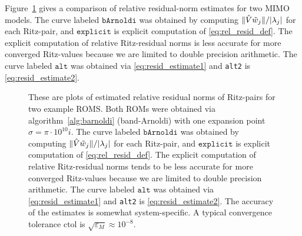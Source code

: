 Figure~\ref{fig:barnoldi_rel_resid_norms1} gives a comparison of relative residual-norm estimates for two MIMO models.   The curve labeled $\texttt{bArnoldi}$ was obtained by computing $\| \hat{V} \tilde{w}_j \| / | \lambda_j|$ for each Ritz-pair, and $\texttt{explicit}$ is explicit computation of \eqref{eq:rel_resid_def}.     The explicit computation of relative Ritz-residual norms is less accurate for more converged Ritz-values because we are limited to double precision arithmetic.  The curve labeled $\texttt{alt}$ was obtained via \eqref{eq:resid_estimate1} and  \texttt{alt2} is  \eqref{eq:resid_estimate2}.

\begin{figure}
\centering
{}

\caption{\label{fig:barnoldi_rel_resid_norms1}These are plots of estimated relative residual norms of Ritz-pairs for two example ROMS. Both ROMs were obtained via algorithm~\ref{alg:barnoldi} (band-Arnoldi) with one expansion point $\sigma=\pi  \cdot 10^{10} i$.    The curve labeled $\texttt{bArnoldi}$ was obtained by computing $\| \hat{V} \tilde{w}_j \| / | \lambda_j|$ for each Ritz-pair, and $\texttt{explicit}$ is explicit computation of \eqref{eq:rel_resid_def}.     The explicit computation of relative Ritz-residual norms tends to be less accurate for more converged Ritz-values because we are limited to double precision arithmetic.  The curve labeled $\texttt{alt}$ was obtained via \eqref{eq:resid_estimate1} and  \texttt{alt2} is  \eqref{eq:resid_estimate2}.   
The accuracy of the estimates is somewhat system-specific.  A typical convergence tolerance $\text{ctol}$ is $\sqrt{\varepsilon_M} \approx 10^{-8}$.}
\end{figure}




